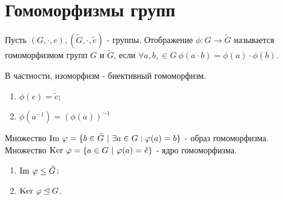 \section{Гомоморфизмы групп}
\begin{definition}
    Пусть $(G, \cdot, e), (\tilde{G}, \cdot, \tilde{e})$ - группы. Отображение $\phi: G \rightarrow \tilde{G}$ называется гомоморфизмом групп $G$ и $\tilde{G}$, если $\forall a, b, \in G \ \phi(a\cdot b) = \phi(a)\cdot\phi(b)$.
\end{definition}
\begin{remark}
    В частности, изоморфизм - биективный гомоморфизм.
\end{remark}
\begin{subtheorem}\tab
    \begin{enumerate}
        \item $\phi(e) = \tilde{e}$;
        \item $\phi(a^{-1}) = (\phi(a))^{-1}$
    \end{enumerate}
\end{subtheorem}
\begin{definition}
    Множество $\textup{Im } \phi = \{b \in \tilde{G} \ | \ \exists a \in G: \phi(a) = b\}$ - образ гомоморфизма.
    Множество $\textup{Ker } \phi = \{a \in G \ | \ \phi(a) = \tilde{e}\}$ - ядро гомоморфизма.
\end{definition}
\begin{subtheoremnum}\tab
    \begin{enumerate}
        \item $\textup{Im } \phi \leq \tilde{G}$;
        \item $\textup{Ker } \phi \unlhd G$.
    \end{enumerate}
\end{subtheoremnum}
